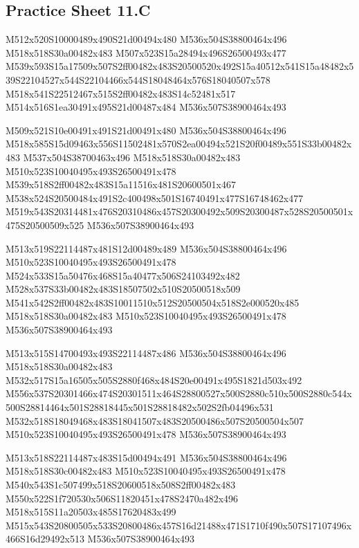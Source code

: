 \documentclass{article}
\begin{document}
\subsection{Practice Sheet 11.C}

\begin{multicols}{5}
\begin{center}

M512x520S10000489x490S21d00494x480 %
M536x504S38800464x496 %
M518x518S30a00482x483 %
M507x523S15a28494x496S26500493x477 %
M539x593S15a17509x507S2ff00482x483S20500520x492S15a40512x541S15a48482x539S22104527x544S22104466x544S18048464x576S18040507x578 %
M518x541S22512467x515S2ff00482x483S14c52481x517 %
M514x516S1ea30491x495S21d00487x484 %
M536x507S38900464x493 %
\vfil
\columnbreak

M509x521S10e00491x491S21d00491x480 %
M536x504S38800464x496 %
M518x585S15d09463x556S11502481x570S2ea00494x521S20f00489x551S33b00482x483 %
M537x504S38700463x496 %
M518x518S30a00482x483 %
M510x523S10040495x493S26500491x478 %
M539x518S2ff00482x483S15a11516x481S20600501x467 %
M538x524S20500484x491S2c400498x501S16740491x477S16748462x477 %
M519x543S20314481x476S20310486x457S20300492x509S20300487x528S20500501x475S20500509x525 %
M536x507S38900464x493 %
\vfil
\columnbreak

M513x519S22114487x481S12d00489x489 %
M536x504S38800464x496 %
M510x523S10040495x493S26500491x478 %
M524x533S15a50476x468S15a40477x506S24103492x482 %
M528x537S33b00482x483S18507502x510S20500518x509 %
M541x542S2ff00482x483S10011510x512S20500504x518S2e000520x485 %
M518x518S30a00482x483 %
M510x523S10040495x493S26500491x478 %
M536x507S38900464x493 %
\vfil
\columnbreak

M513x515S14700493x493S22114487x486 %
M536x504S38800464x496 %
M518x518S30a00482x483 %
M532x517S15a16505x505S2880f468x484S20e00491x495S1821d503x492 %
M556x537S20301466x474S20301511x464S28800527x500S2880c510x500S2880c544x500S28814464x501S28818445x501S28818482x502S2fb04496x531 %
M532x518S18049468x483S18041507x483S20500486x507S20500504x507 %
M510x523S10040495x493S26500491x478 %
M536x507S38900464x493 %
\vfil
\columnbreak

M513x518S22114487x483S15d00494x491 %
M536x504S38800464x496 %
M518x518S30c00482x483 %
M510x523S10040495x493S26500491x478 %
M540x543S1c507499x518S20600518x508S2ff00482x483 %
M550x522S1f720530x506S11820451x478S2470a482x496 %
M518x515S11a20503x485S17620483x499 %
M515x543S20800505x533S20800486x457S16d21488x471S1710f490x507S17107496x466S16d29492x513 %
M536x507S38900464x493 %
\vfil

\end{center}
\end{multicols}
\end{document}
